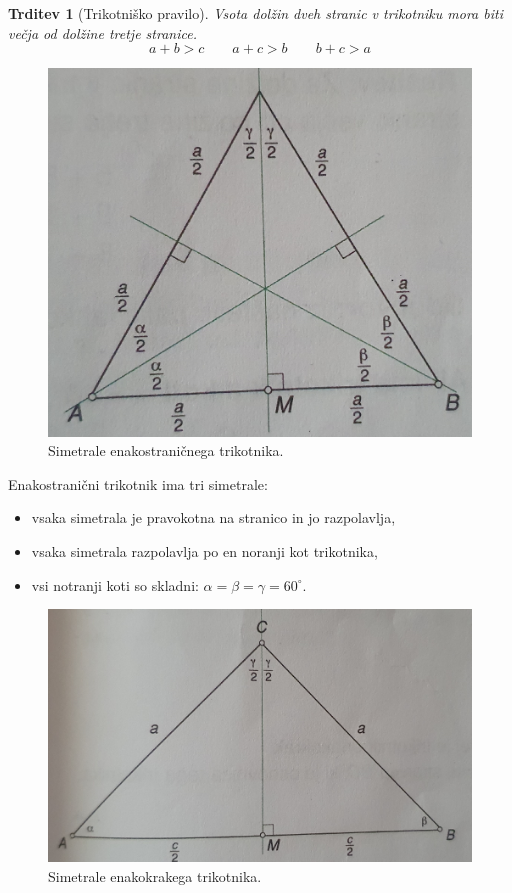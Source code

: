 \documentclass{article}
\newtheorem{trditev}{Trditev}[subsection]
\begin{document}



\begin{trditev}[Trikotniško pravilo]
    Vsota dolžin dveh stranic v trikotniku mora biti večja od dolžine tretje stranice.
    \[
      a + b > c \quad\quad  a + c > b \quad\quad  b + c > a  
    \]
\end{trditev}


\begin{figure}[h]
    \includegraphics[width=0.5\linewidth]{simetraleEnakostranicni.png}
    \centering
    \caption{Simetrale enakostraničnega trikotnika.}
\end{figure}

Enakostranični trikotnik ima tri simetrale:
\begin{itemize}
    \item vsaka simetrala je pravokotna na stranico in jo razpolavlja,
    \item vsaka simetrala razpolavlja po en noranji kot trikotnika,
    \item vsi notranji koti so skladni: $\alpha = \beta = \gamma = 60^\circ$.
\end{itemize}

\begin{figure}[h]
    \includegraphics[width=0.5\linewidth]{simetraleEnakokraki.png}
    \centering
    \caption{Simetrale enakokrakega trikotnika.}
\end{figure}
\end{document}

